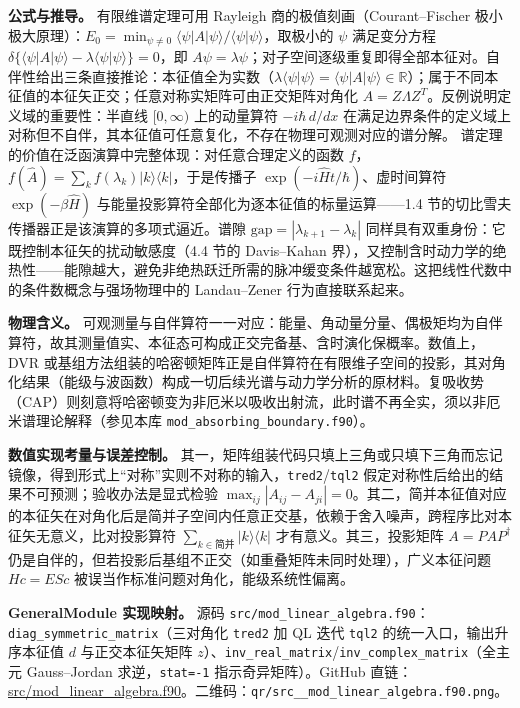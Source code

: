 \documentclass[
]{ctexbook}
\begin{document}
\textbf{公式与推导。} 有限维谱定理可用 Rayleigh
商的极值刻画（Courant--Fischer
极小极大原理）：\(E_0=\min_{\psi\neq0}\langle\psi|A|\psi\rangle/\langle\psi|\psi\rangle\)，取极小的
\(\psi\) 满足变分方程
\(\delta\{\langle\psi|A|\psi\rangle-\lambda\langle\psi|\psi\rangle\}=0\)，即
\(A\psi=\lambda\psi\)；对子空间逐级重复即得全部本征对。自伴性给出三条直接推论：本征值全为实数（\(\lambda\langle\psi|\psi\rangle=\langle\psi|A|\psi\rangle\in\mathbb{R}\)）；属于不同本征值的本征矢正交；任意对称实矩阵可由正交矩阵对角化
\(A=Z\Lambda Z^{T}\)。反例说明定义域的重要性：半直线 \([0,\infty)\)
上的动量算符 \(-i\hbar\,d/dx\)
在满足边界条件的定义域上对称但不自伴，其本征值可任意复化，不存在物理可观测对应的谱分解。
谱定理的价值在泛函演算中完整体现：对任意合理定义的函数
\(f\)，\(f(\hat{A})=\sum_k f(\lambda_k)|k\rangle\langle k|\)，于是传播子
\(\exp(-i\hat{H}t/\hbar)\)、虚时间算符 \(\exp(-\beta\hat{H})\)
与能量投影算符全部化为逐本征值的标量运算------1.4
节的切比雪夫传播器正是该演算的多项式逼近。谱隙
\(\mathrm{gap}=|\lambda_{k+1}-\lambda_k|\)
同样具有双重身份：它既控制本征矢的扰动敏感度（4.4 节的 Davis--Kahan
界），又控制含时动力学的绝热性------能隙越大，避免非绝热跃迁所需的脉冲缓变条件越宽松。这把线性代数中的条件数概念与强场物理中的
Landau--Zener 行为直接联系起来。

\textbf{物理含义。}
可观测量与自伴算符一一对应：能量、角动量分量、偶极矩均为自伴算符，故其测量值实、本征态可构成正交完备基、含时演化保概率。数值上，DVR
或基组方法组装的哈密顿矩阵正是自伴算符在有限维子空间的投影，其对角化结果（能级与波函数）构成一切后续光谱与动力学分析的原材料。复吸收势（CAP）则刻意将哈密顿变为非厄米以吸收出射流，此时谱不再全实，须以非厄米谱理论解释（参见本库
\texttt{mod\_absorbing\_boundary.f90}）。

\textbf{数值实现考量与误差控制。}
其一，矩阵组装代码只填上三角或只填下三角而忘记镜像，得到形式上``对称''实则不对称的输入，\texttt{tred2}/\texttt{tql2}
假定对称性后给出的结果不可预测；验收办法是显式检验
\(\max_{ij}|A_{ij}-A_{ji}|=0\)。其二，简并本征值对应的本征矢在对角化后是简并子空间内任意正交基，依赖于舍入噪声，跨程序比对本征矢无意义，比对投影算符
\(\sum_{k\in\text{简并}}|k\rangle\langle k|\) 才有意义。其三，投影矩阵
\(A=PAP^{\dagger}\)
仍是自伴的，但若投影后基组不正交（如重叠矩阵未同时处理），广义本征问题
\(Hc=ESc\) 被误当作标准问题对角化，能级系统性偏离。

\textbf{GeneralModule 实现映射。} 源码
\texttt{src/mod\_linear\_algebra.f90}：\texttt{diag\_symmetric\_matrix}（三对角化
\texttt{tred2} 加 QL 迭代 \texttt{tql2} 的统一入口，输出升序本征值 \(d\)
与正交本征矢矩阵
\(z\)）、\texttt{inv\_real\_matrix}/\texttt{inv\_complex\_matrix}（全主元
Gauss--Jordan 求逆，\texttt{stat=-1} 指示奇异矩阵）。GitHub
直链：\href{https://github.com/l1Ha/QuantumGeneralModule/blob/main/src/mod_linear_algebra.f90}{src/mod\_linear\_algebra.f90}。二维码：\texttt{qr/src\_\_mod\_linear\_algebra.f90.png}。
\end{document}
